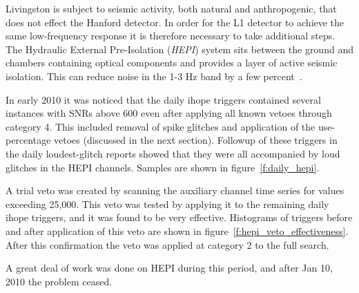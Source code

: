
Livingston is subject to seismic activity, both natural and
anthropogenic, that does not effect the Hanford detector.  In order
for the L1 detector to achieve the same low-frequency response it is
therefore necessary to take additional steps.  The Hydraulic External
Pre-Isolation (\emph{HEPI}) system sits between the ground and
chambers containing optical components and provides a layer of active
seismic isolation.  This can reduce noise in the 1-3 Hz band by a few
percent~\cite{Wen:thesis}.

In early 2010 it was noticed that the daily ihope triggers contained
several instances with SNRs above 600 even after applying all known
vetoes through category 4.  This included removal of spike glitches
and application of the use-percentage vetoes (discussed in the next
section).  Followup of these triggers in the daily loudest-glitch
reports showed that they were all accompanied by loud glitches in the
HEPI channels.  Samples are shown in figure~\ref{f:daily_hepi}.

A trial veto was created by scanning the auxiliary channel time series
for values exceeding 25,000.  This veto was tested by applying it to
the remaining daily ihope triggers, and it was found to be very
effective.  Histograms of triggers before and after application of
this veto are shown in figure~\ref{f:hepi_veto_effectiveness}.  After
this confirmation the veto was applied at category 2 to the full
search.

A great deal of work was done on HEPI during this period, and after
Jan 10, 2010 the problem ceased.

%
%
%


